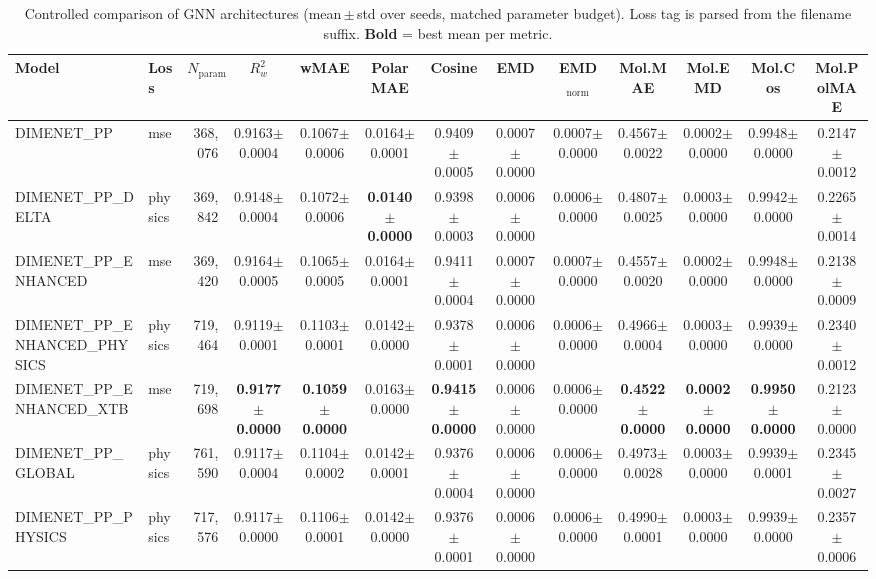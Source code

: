 \begin{table}[ht]
\centering
\caption{Controlled comparison of GNN architectures (mean\,$\pm$\,std over seeds, matched parameter budget). Loss tag is parsed from the filename suffix. \textbf{Bold} = best mean per metric.}
\label{tab:benchmark}
\small
\begin{tabular}{l l r c c c c c c c c c c }
\toprule
Model & Loss & $N_{\text{params}}$ & $R^2_w$ & wMAE & PolarMAE & Cosine & EMD & EMD$_\mathrm{norm}$ & Mol.MAE & Mol.EMD & Mol.Cos & Mol.PolMAE \\
\midrule
DIMENET_PP & mse & 368,076 & 0.9163$\pm$0.0004 & 0.1067$\pm$0.0006 & 0.0164$\pm$0.0001 & 0.9409$\pm$0.0005 & 0.0007$\pm$0.0000 & 0.0007$\pm$0.0000 & 0.4567$\pm$0.0022 & 0.0002$\pm$0.0000 & 0.9948$\pm$0.0000 & 0.2147$\pm$0.0012 \\
DIMENET_PP_DELTA & physics & 369,842 & 0.9148$\pm$0.0004 & 0.1072$\pm$0.0006 & \textbf{0.0140$\pm$0.0000} & 0.9398$\pm$0.0003 & 0.0006$\pm$0.0000 & 0.0006$\pm$0.0000 & 0.4807$\pm$0.0025 & 0.0003$\pm$0.0000 & 0.9942$\pm$0.0000 & 0.2265$\pm$0.0014 \\
DIMENET_PP_ENHANCED & mse & 369,420 & 0.9164$\pm$0.0005 & 0.1065$\pm$0.0005 & 0.0164$\pm$0.0001 & 0.9411$\pm$0.0004 & 0.0007$\pm$0.0000 & 0.0007$\pm$0.0000 & 0.4557$\pm$0.0020 & 0.0002$\pm$0.0000 & 0.9948$\pm$0.0000 & 0.2138$\pm$0.0009 \\
DIMENET_PP_ENHANCED_PHYSICS & physics & 719,464 & 0.9119$\pm$0.0001 & 0.1103$\pm$0.0001 & 0.0142$\pm$0.0000 & 0.9378$\pm$0.0001 & 0.0006$\pm$0.0000 & 0.0006$\pm$0.0000 & 0.4966$\pm$0.0004 & 0.0003$\pm$0.0000 & 0.9939$\pm$0.0000 & 0.2340$\pm$0.0012 \\
DIMENET_PP_ENHANCED_XTB & mse & 719,698 & \textbf{0.9177$\pm$0.0000} & \textbf{0.1059$\pm$0.0000} & 0.0163$\pm$0.0000 & \textbf{0.9415$\pm$0.0000} & 0.0006$\pm$0.0000 & 0.0006$\pm$0.0000 & \textbf{0.4522$\pm$0.0000} & \textbf{0.0002$\pm$0.0000} & \textbf{0.9950$\pm$0.0000} & 0.2123$\pm$0.0000 \\
DIMENET_PP_GLOBAL & physics & 761,590 & 0.9117$\pm$0.0004 & 0.1104$\pm$0.0002 & 0.0142$\pm$0.0001 & 0.9376$\pm$0.0004 & 0.0006$\pm$0.0000 & 0.0006$\pm$0.0000 & 0.4973$\pm$0.0028 & 0.0003$\pm$0.0000 & 0.9939$\pm$0.0001 & 0.2345$\pm$0.0027 \\
DIMENET_PP_PHYSICS & physics & 717,576 & 0.9117$\pm$0.0000 & 0.1106$\pm$0.0001 & 0.0142$\pm$0.0000 & 0.9376$\pm$0.0001 & 0.0006$\pm$0.0000 & 0.0006$\pm$0.0000 & 0.4990$\pm$0.0001 & 0.0003$\pm$0.0000 & 0.9939$\pm$0.0000 & 0.2357$\pm$0.0006 \\

\end{tabular}
\end{table}
